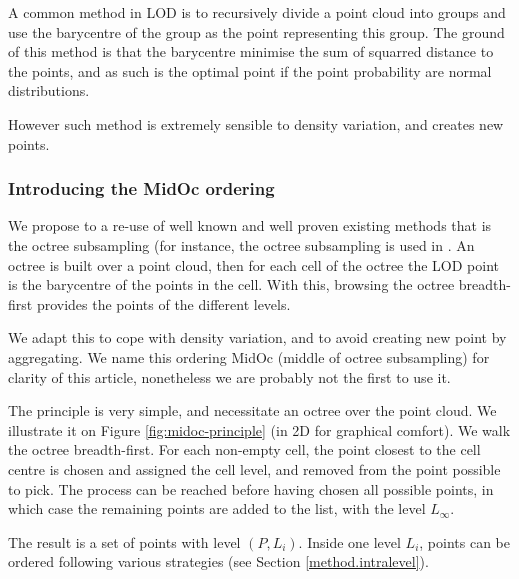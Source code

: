 		A common method in LOD is to recursively divide a point cloud into groups and use the barycentre of the group as the point representing this group. The ground of this method is that the barycentre minimise the sum of squarred distance to the points, and as such is the optimal point if the point probability are normal distributions.
		
		However such method is extremely sensible to density variation, and creates new points. 
		
		\subsubsection{Introducing the MidOc ordering}
		
		
		We propose to a re-use of well known and well proven existing methods that is the octree subsampling (for instance, the octree subsampling is used in \cite{Girardeau-Montaut2014}.
		An octree is built over a point cloud, then for each cell of the octree the LOD point is the barycentre of the points in the cell.  With this, browsing the octree breadth-first provides the points of the different levels.
		
		We adapt this to cope with density variation, and to avoid creating new point by aggregating.   
		We name this ordering MidOc (middle of octree subsampling) for clarity of this article, nonetheless we are probably not the first to use it.
		
		The principle is very simple, and necessitate an octree over the point cloud.
		We illustrate it on Figure \ref{fig:midoc-principle} (in 2D for graphical comfort).
		We walk the octree breadth-first.
		For each non-empty cell, the point closest to the cell centre is chosen and assigned the cell level,
		and removed from the point possible to pick.
		The process can be reached before having chosen all possible points,
		in which case the remaining points are added to the list, with the level $L_\infty$.
		
		The result is a set of points with level $(P,L_i)$.
		Inside one level $L_i$, points can be ordered following various strategies (see Section \ref{method.intralevel}).
		
	
		  
